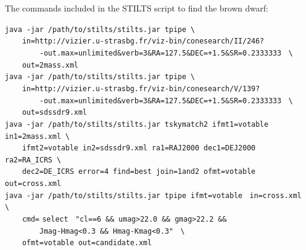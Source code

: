 \documentclass [a4paper, 12pt]{article}
\begin{document}
The commands included in the STILTS script to find the brown dwarf:\\
\begin{small}
\noindent\verb|java -jar /path/to/stilts/stilts.jar tpipe \| \\
\verb|    |
\textquotesingle
\verb|in=http://vizier.u-strasbg.fr/viz-bin/conesearch/II/246?| \\
\verb|        -out.max=unlimited&verb=3&RA=127.5&DEC=+1.5&SR=0.2333333|
\textquotesingle
\verb| \|\\
\verb|    out=2mass.xml| \\

\noindent\verb|java -jar /path/to/stilts/stilts.jar tpipe \| \\
\verb|    |
\textquotesingle
\verb|in=http://vizier.u-strasbg.fr/viz-bin/conesearch/V/139?| \\
\verb|        -out.max=unlimited&verb=3&RA=127.5&DEC=+1.5&SR=0.2333333|
\textquotesingle
\verb| \| \\
\verb|    out=sdssdr9.xml| \\

\noindent\verb|java -jar /path/to/stilts/stilts.jar tskymatch2 ifmt1=votable |
\verb|in1=2mass.xml \| \\
\verb|    ifmt2=votable in2=sdssdr9.xml ra1=RAJ2000 dec1=DEJ2000 |
\verb|ra2=RA_ICRS \| \\
\verb|    dec2=DE_ICRS error=4 find=best join=1and2 ofmt=votable |
\verb|out=cross.xml| \\

\noindent\verb|java -jar /path/to/stilts/stilts.jar tpipe ifmt=votable | 
\verb|in=cross.xml \| \\
\verb|    cmd=|\textquotesingle
\verb|select |
\verb|"cl==6 && umag>22.0 && gmag>22.2 && |\\
\verb|        Jmag-Hmag<0.3 && Hmag-Kmag<0.3"|
\textquotesingle
\verb| \| \\
\verb|    ofmt=votable out=candidate.xml| \\
\end{small}

%
\end{document}
